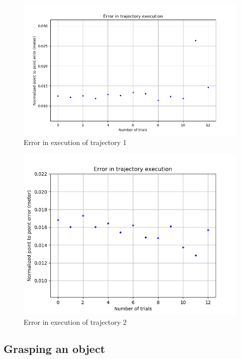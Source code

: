 \begin{figure}[H]
	\centering
	\includegraphics[scale=0.6]{images/HSR_3/sequence_0_e.png}
	\caption{Error in execution of trajectory 1}
	\label{fig:sequence_0_e}
\end{figure}


\begin{figure}[H]
	\centering
	\includegraphics[scale=0.7]{images/HSR_3/sequence_1_e.png}
	\caption{Error in execution of trajectory 2}
	\label{fig:sequence_11_e}
\end{figure}


\subsection{Grasping an object}

